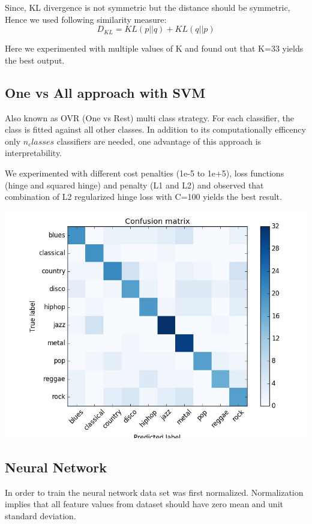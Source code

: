 \documentclass[conference]{IEEEtran}
\begin{document}
Since, KL divergence is not symmetric but the distance should be symmetric, Hence we used following similarity measure:
$$ {D}_{KL} =  KL\left(p||q\right) + KL\left(q||p\right) $$

Here we experimented with multiple values of K and found out that K=33 yields the best output.

\subsection{One vs All approach with SVM}
\label{sub:One vs All approach with SVM}

Also known as OVR (One vs Rest) multi class strategy. For each classifier, the class is fitted against all other classes. In addition to its computationally efficency only $n_classes$ classifiers are needed, one advantage of this approach is interpretability.

 We experimented with different cost penalties (1e-5 to 1e+5), loss functions (hinge and squared hinge) and penalty (L1 and L2) and observed that combination of L2 regularized hinge loss with C=100 yields the best result.

\includegraphics[width=\columnwidth]{LINEARSVC}

\subsection{Neural Network}
\label{sub:Neural Network}
In order to train the neural network data set was first normalized. Normalization implies that all feature values from dataset should have zero mean and unit standard deviation.
\end{document}
